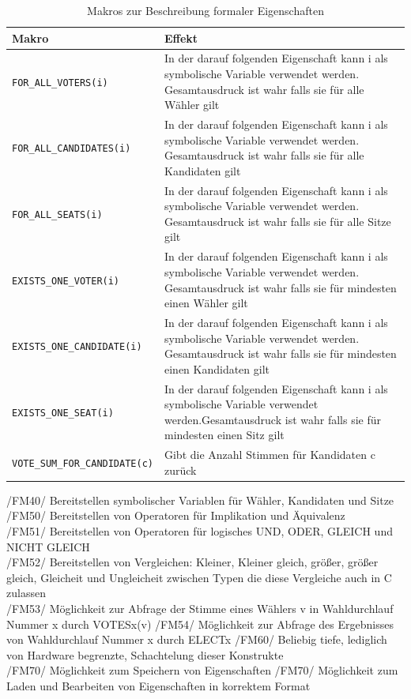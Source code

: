 \documentclass[a4paper]{scrreprt}
\begin{document}
\begin{table}[H]
\caption{Makros zur Beschreibung formaler Eigenschaften}
\begin{tabular}{|p{5cm}|p{10cm}|}
\hline 
Makro & Effekt \\
\hline 
\verb!FOR_ALL_VOTERS(i)! & In der darauf folgenden Eigenschaft kann i als symbolische Variable verwendet werden. Gesamtausdruck ist wahr falls sie für alle Wähler gilt \\
\hline 
\verb!FOR_ALL_CANDIDATES(i)! & In der darauf folgenden Eigenschaft kann i als symbolische Variable verwendet werden. Gesamtausdruck ist wahr falls sie für alle Kandidaten gilt \\
\hline 
\verb!FOR_ALL_SEATS(i)! & In der darauf folgenden Eigenschaft kann i als symbolische Variable verwendet werden. Gesamtausdruck ist wahr falls sie für alle Sitze gilt \\
\hline 
\verb!EXISTS_ONE_VOTER(i)! & In der darauf folgenden Eigenschaft kann i als symbolische Variable verwendet werden. Gesamtausdruck ist wahr falls sie für mindesten einen Wähler gilt \\
\hline 
\verb!EXISTS_ONE_CANDIDATE(i)! & In der darauf folgenden Eigenschaft kann i als symbolische Variable verwendet werden. Gesamtausdruck ist wahr falls sie für mindesten einen Kandidaten gilt \\
\hline 
\verb!EXISTS_ONE_SEAT(i)! & In der darauf folgenden Eigenschaft kann i als symbolische Variable verwendet werden.Gesamtausdruck ist wahr falls sie für mindesten einen Sitz gilt \\
\hline 
\verb!VOTE_SUM_FOR_CANDIDATE(c)! & Gibt die Anzahl Stimmen für Kandidaten c zurück\\
\hline 
\end{tabular}
\label{table:Macros_for_formal_Attributes}
\end{table}

/FM40/ Bereitstellen symbolischer Variablen für Wähler, Kandidaten und Sitze \\
/FM50/ Bereitstellen von Operatoren für Implikation und Äquivalenz \\
/FM51/ Bereitstellen von Operatoren für logisches UND, ODER, GLEICH und NICHT GLEICH \\
/FM52/ Bereitstellen von Vergleichen: Kleiner, Kleiner gleich, größer, größer gleich, Gleicheit und Ungleicheit zwischen Typen die diese Vergleiche auch in C zulassen \\
/FM53/ Möglichkeit zur Abfrage der Stimme eines Wählers v in Wahldurchlauf Nummer x durch VOTESx(v)
/FM54/ Möglichkeit zur Abfrage des Ergebnisses von Wahldurchlauf Nummer x durch ELECTx
/FM60/ Beliebig tiefe, lediglich von Hardware begrenzte, Schachtelung dieser Konstrukte \\
/FM70/ Möglichkeit zum Speichern von Eigenschaften
/FM70/ Möglichkeit zum Laden und Bearbeiten von Eigenschaften in korrektem Format
\end{document}
